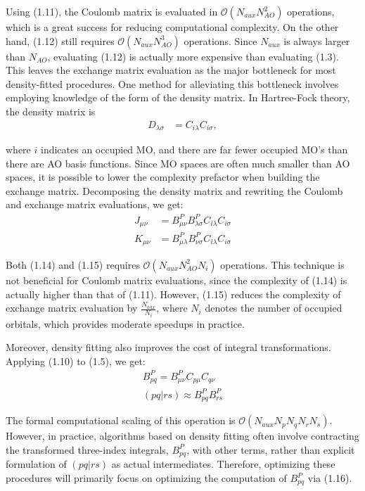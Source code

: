 \noindent Using (1.11), the Coulomb matrix is evaluated in $\mathcal{O}(N_{aux}N_{AO}^2)$ operations, which is a great success
for reducing computational complexity. On the other hand, (1.12) still requires $\mathcal{O}(N_{aux}N_{AO}^3)$ operations. 
Since $N_{aux}$ is always larger than $N_{AO}$, evaluating (1.12) is actually more expensive than evaluating (1.3).
This leaves the exchange matrix evaluation as the major bottleneck for most density-fitted procedures.
One method for alleviating this bottleneck involves employing knowledge 
of the form of the density matrix. In Hartree-Fock theory, the density matrix is 
\begin{align}
D_{\lambda \sigma} &= C_{i \lambda}C_{i \sigma},
\end{align}

\noindent where $i$ indicates an occupied MO, and there are far fewer occupied MO's than there are AO basis functions.
\noindent Since MO spaces are often much smaller than AO spaces, it is possible to lower the complexity prefactor when 
building the exchange matrix. 
Decomposing the density matrix and rewriting the Coulomb and exchange matrix evaluations, we get:
\begin{align}
J_{\mu \nu} &= B_{\mu \nu}^P B_{\lambda \sigma}^PC_{i \lambda}C_{i \sigma} \\
K_{\mu \nu} &= B_{\mu \lambda}^P B_{\nu \sigma}^PC_{i \lambda}C_{i \sigma}
\end{align}

\noindent Both (1.14) and (1.15) requires $\mathcal{O}(N_{aux}N_{AO}^2N_i)$ operations.
This technique is not beneficial for Coulomb matrix evaluations, since the complexity of (1.14) is actually
higher than that of (1.11). However, (1.15) reduces the complexity of exchange matrix evaluation by  
$\frac{N_{aux}}{N_i}$, where $N_i$ denotes the number of occupied orbitals, which provides moderate speedups in practice.

Moreover, density fitting also improves the cost of integral transformations. Applying (1.10) to (1.5), we get:
\begin{align}
B^P_{pq} = B^P_{\mu \nu}C_{p \mu}C_{q \nu} \\
(pq | rs) \approx B^P_{pq}B^P_{rs}
\end{align}

\noindent The formal computational scaling of this operation is $\mathcal{O}(N_{aux}N_pN_qN_rN_s)$. However, in practice,
algorithms based on density fitting often involve contracting the transformed three-index integrals, $B^P_{pq}$, with other terms, 
rather than explicit formulation of $(pq|rs)$ as actual intermediates. Therefore, optimizing these procedures will primarily
focus on optimizing the computation of $B^P_{pq}$ via (1.16). 

